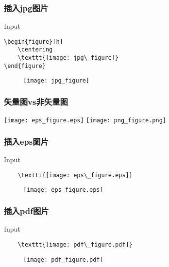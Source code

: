 \begin{frame}[fragile]\frametitle{插入jpg图片}
   \begin{block}{Input}
    \begin{verbatim}
\begin{figure}[h]
    \centering
    \texttt{[image: jpg\_figure]}
\end{figure}
    \end{verbatim}
   \end{block}
   \begin{figure}[h]
    \centering
    \texttt{[image: jpg\_figure]}
   \end{figure}
\end{frame}

\begin{frame}[fragile]\frametitle{矢量图vs非矢量图}
    \begin{center}
    \texttt{[image: eps\_figure.eps]}\qquad
    \texttt{[image: png\_figure.png]}
    \end{center}
\end{frame}


\begin{frame}[fragile]\frametitle{插入eps图片}
   \begin{block}{Input}
    \begin{verbatim}
    \texttt{[image: eps\_figure.eps]}
    \end{verbatim}
   \end{block}
   \begin{figure}[h]
    \centering
    \texttt{[image: eps\_figure.eps]}
   \end{figure}
\end{frame}

\begin{frame}[fragile]\frametitle{插入pdf图片}
   \begin{block}{Input}
    \begin{verbatim}
    \texttt{[image: pdf\_figure.pdf]}
    \end{verbatim}
   \end{block}
   \begin{figure}[h]
    \centering
    \texttt{[image: pdf\_figure.pdf]}
   \end{figure}
\end{frame}

